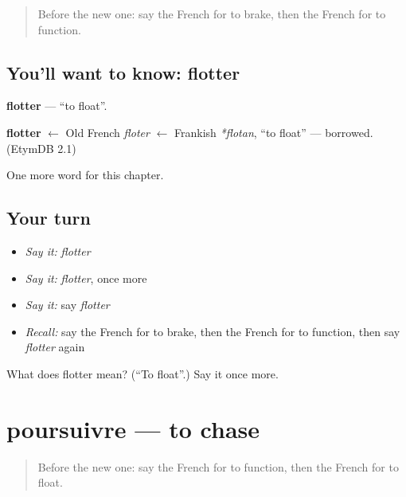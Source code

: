 \label{lesson:FR-C212-flotter}



\begin{quote}
Before the new one: say the French for to brake, then the French for to function.
\end{quote}

\subsection*{You'll want to know: flotter}
\textbf{flotter} — \textquotedblleft{}to float\textquotedblright{}.

\begin{cousinweb}
\textbf{flotter} $\leftarrow$ Old French \emph{floter} $\leftarrow$ Frankish \emph{*flotan}, \textquotedblleft{}to float\textquotedblright{} — borrowed. (EtymDB 2.1)
\end{cousinweb}

\begin{grammarlens}[title={What you've built}]
One more word for this chapter.
\end{grammarlens}

\subsection*{Your turn}
\begin{itemize}
\raggedright
  \item \emph{Say it:} \emph{flotter}
  \item \emph{Say it:} \emph{flotter}, once more
  \item \emph{Say it:} say \emph{flotter}
  \item \emph{Recall:} say the French for to brake, then the French for to function, then say \emph{flotter} again
\end{itemize}

\begin{tcolorbox}[breakable,colback=teal!4,colframe=teal!35!black,title={Before you move on}]
What does flotter mean? (\textquotedblleft{}To float\textquotedblright{}.) Say it once more.
\end{tcolorbox}
\section[poursuivre]{poursuivre — to chase}

\label{lesson:FR-C212-poursuivre}



\begin{quote}
Before the new one: say the French for to function, then the French for to float.
\end{quote}

